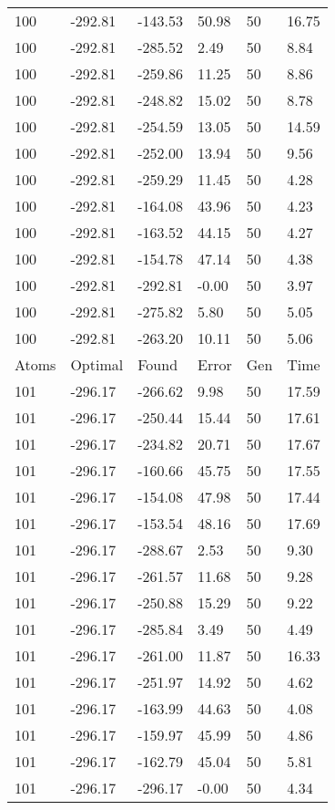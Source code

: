 \documentclass{report}
\begin{document}
\begin{appendix}
\begin{longtable}{llllll}
100 & -292.81 & -143.53 & 50.98 & 50 & 16.75 \\
100 & -292.81 & -285.52 & 2.49 & 50 & 8.84 \\
100 & -292.81 & -259.86 & 11.25 & 50 & 8.86 \\
100 & -292.81 & -248.82 & 15.02 & 50 & 8.78 \\
100 & -292.81 & -254.59 & 13.05 & 50 & 14.59 \\
100 & -292.81 & -252.00 & 13.94 & 50 & 9.56 \\
100 & -292.81 & -259.29 & 11.45 & 50 & 4.28 \\
100 & -292.81 & -164.08 & 43.96 & 50 & 4.23 \\
100 & -292.81 & -163.52 & 44.15 & 50 & 4.27 \\
100 & -292.81 & -154.78 & 47.14 & 50 & 4.38 \\
100 & -292.81 & -292.81 & -0.00 & 50 & 3.97 \\
100 & -292.81 & -275.82 & 5.80 & 50 & 5.05 \\
100 & -292.81 & -263.20 & 10.11 & 50 & 5.06 \\
Atoms & Optimal & Found & Error & Gen & Time \\
101 & -296.17 & -266.62 & 9.98 & 50 & 17.59 \\
101 & -296.17 & -250.44 & 15.44 & 50 & 17.61 \\
101 & -296.17 & -234.82 & 20.71 & 50 & 17.67 \\
101 & -296.17 & -160.66 & 45.75 & 50 & 17.55 \\
101 & -296.17 & -154.08 & 47.98 & 50 & 17.44 \\
101 & -296.17 & -153.54 & 48.16 & 50 & 17.69 \\
101 & -296.17 & -288.67 & 2.53 & 50 & 9.30 \\
101 & -296.17 & -261.57 & 11.68 & 50 & 9.28 \\
101 & -296.17 & -250.88 & 15.29 & 50 & 9.22 \\
101 & -296.17 & -285.84 & 3.49 & 50 & 4.49 \\
101 & -296.17 & -261.00 & 11.87 & 50 & 16.33 \\
101 & -296.17 & -251.97 & 14.92 & 50 & 4.62 \\
101 & -296.17 & -163.99 & 44.63 & 50 & 4.08 \\
101 & -296.17 & -159.97 & 45.99 & 50 & 4.86 \\
101 & -296.17 & -162.79 & 45.04 & 50 & 5.81 \\
101 & -296.17 & -296.17 & -0.00 & 50 & 4.34 \\

\end{longtable}
\end{appendix}
\end{document}
